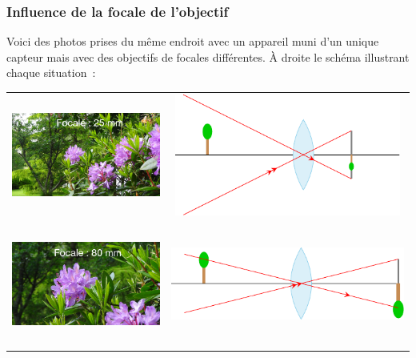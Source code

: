 \documentclass[../../main/main.tex]{subfiles}
\begin{document}
\subsubsection{Influence de la focale de l'objectif}

Voici des photos prises du même endroit avec un appareil muni d'un unique
capteur mais avec des objectifs de focales différentes. À droite le schéma
illustrant chaque situation~:

\begin{center}
	\begin{tabular}{cc}
		\includegraphics[height=4cm]{focale-25mm.png} &
		\includegraphics[height=4cm]{focale_obj-a}         \\
		\includegraphics[height=4cm]{focale-80mm.png} &
		\includegraphics[width=.5\linewidth]{focale_obj-b} \\
	\end{tabular}
\end{center}
\end{document}
